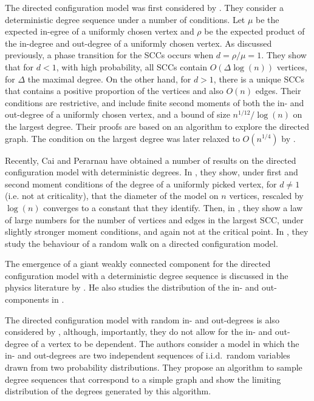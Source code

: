 The directed configuration model was first considered by \citet{cooperSizeLargestStrongly2004}. They consider a deterministic degree sequence under a number of conditions. Let $\mu$ be the expected in-egree of a uniformly chosen vertex and $\rho$ be the expected product of the in-degree and out-degree of a uniformly chosen vertex. As discussed previously, a phase transition for the SCCs occurs when $d=\rho/\mu=1$. They show that for $d<1$, with high probability, all SCCs contain $O(\Delta\log(n))$ vertices, for $\Delta$ the maximal degree. On the other hand, for $d>1$, there is a unique SCCs that contains a positive proportion of the vertices and also $O(n)$ edges. Their conditions are restrictive, and include finite second moments of both the in- and out-degree of a uniformly chosen vertex, and a bound of size $n^{1/12}/\log(n)$ on the largest degree. Their proofs are based on an algorithm to explore the directed graph. The condition on the largest degree was later relaxed to $O(n^{1/4})$ by \citet{Graf2016}.

Recently, Cai and Perarnau have obtained a number of results on the directed configuration model with deterministic degrees. In \cite{caiDiameterDirectedConfiguration2020}, they show, under first and second moment conditions of the degree of a uniformly picked vertex, for $d\neq 1$ (i.e. not at criticality), that the diameter of the model on $n$ vertices, rescaled by $\log(n)$ converges to a constant that they identify. Then, in \cite{caiGiantComponentDirected2020}, they show a law of large numbers for the number of vertices and edges in the largest SCC, under slightly stronger moment conditions, and again not at the critical point. In \cite{cai2021rw}, they study the behaviour of a random walk on a directed configuration model.
 
The emergence of a giant weakly connected component for the directed configuration model with a deterministic degree sequence is discussed in the physics literature by \citet{Kryven2016}. He also studies the distribution of the in- and out-components in \cite{Kryven2017}.

The directed configuration model with random in- and out-degrees is also considered by \citet{chenDirectedRandomGraphs2013}, although, importantly, they do not allow for the in- and out-degree of a vertex to be dependent. The authors consider a model in which the in- and out-degrees are two independent sequences of i.i.d.\ random variables drawn from two probability distributions. They propose an algorithm to sample degree sequences that correspond to a simple graph and show the limiting distribution of the degrees generated by this algorithm. 


